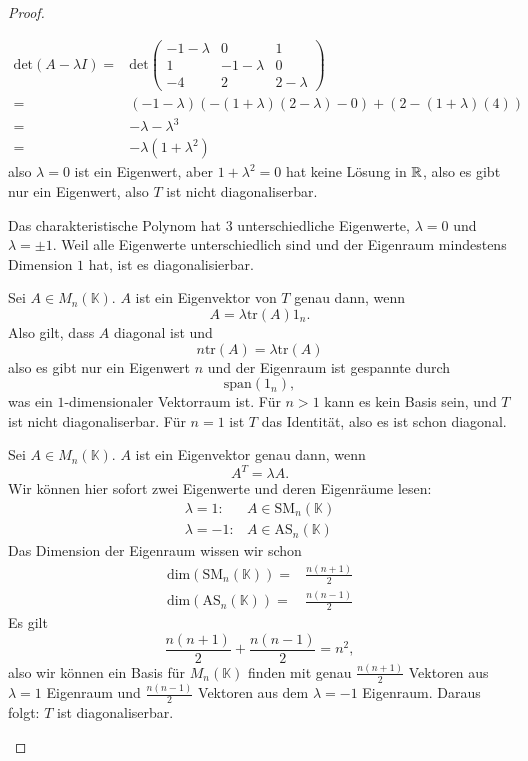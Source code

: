 \begin{proof}
	\begin{parts}
	\item 
		\begin{align*}
			\text{det}(A-\lambda I)=&\text{det}\begin{pmatrix} -1-\lambda & 0 & 1 \\ 1 & -1-\lambda & 0 \\ -4 & 2 & 2-\lambda \end{pmatrix} \\
			=&(-1-\lambda)(-(1+\lambda)(2-\lambda)-0)+(2-(1+\lambda)(4))\\
			=&-\lambda-\lambda^3\\
			=&-\lambda(1+\lambda^2)
		\end{align*}
		also $\lambda=0$ ist ein Eigenwert, aber $1+\lambda^2=0$ hat keine Lösung in $\mathbb{R}$, also es gibt nur ein Eigenwert, also $T$ ist nicht diagonaliserbar.
	\item Das charakteristische Polynom hat $3$ unterschiedliche Eigenwerte, $\lambda=0$ und $\lambda=\pm 1$. Weil alle Eigenwerte unterschiedlich sind und der Eigenraum mindestens Dimension $1$ hat, ist es diagonalisierbar. 
	\item Sei $A\in M_n(\mathbb{K})$. $A$ ist ein Eigenvektor von $T$ genau dann, wenn
		\[
			A=\lambda\text{tr}(A)1_n
		.\] 
		Also gilt, dass $A$ diagonal ist und
		\[
			n\text{tr}(A)=\lambda\text{tr}(A)
	\]
	also es gibt nur ein Eigenwert $n$ und der Eigenraum ist gespannte durch
	\[
		\text{span}\left( 1_n \right) 
	,\] 
	was ein $1$-dimensionaler Vektorraum ist. F\"{u}r $n>1$ kann es kein Basis sein, und $T$ ist nicht diagonaliserbar. F\"{u}r $n=1$ ist $T$ das Identität, also es ist schon diagonal.
\item Sei $A\in M_n(\mathbb{K})$. $A$ ist ein Eigenvektor genau dann, wenn
	\[
	A^T=\lambda A
	.\] 
	Wir können hier sofort zwei Eigenwerte und deren Eigenräume lesen:
	\begin{align*}
		\lambda=1:& A\in \text{SM}_n(\mathbb{K})\\
		\lambda=-1:&A\in \text{AS}_n(\mathbb{K})
	\end{align*}
	Das Dimension der Eigenraum wissen wir schon
	\begin{align*}
		\text{dim}\left( \text{SM}_n(\mathbb{K}) \right) =&\frac{n(n+1)}{2}\\
		\text{dim}(\text{AS}_n(\mathbb{K}))=&\frac{n(n-1)}{2}
	\end{align*}
	Es gilt
	\[
		\frac{n(n+1)}{2}+\frac{n(n-1)}{2}=n^2
	,\]
	also wir können ein Basis für $M_n(\mathbb{K})$ finden mit genau $\frac{n(n+1)}{2}$ Vektoren aus $\lambda=1$ Eigenraum und $\frac{n(n-1)}{2}$ Vektoren aus dem $\lambda=-1$ Eigenraum. Daraus folgt: $T$ ist diagonaliserbar.\qedhere
	\end{parts}
\end{proof}
